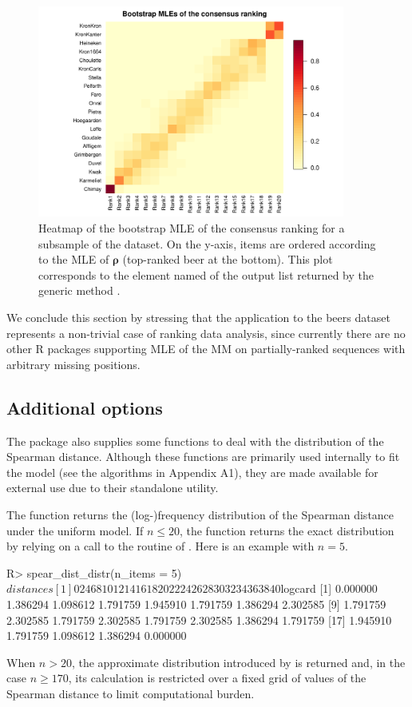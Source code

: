 \begin{figure}[t]
     \centering
     \includegraphics[scale=0.7,width=0.9\textwidth]{figures/RJ2025_paper_heat.pdf}
      \caption{Heatmap of the bootstrap MLE of the consensus ranking for a subsample of the  dataset. On the y-axis, items are ordered according to the MLE of $\bm\rho$ (top-ranked beer at the bottom). This plot corresponds to the element named  of the output list returned by the generic method .}
     \label{fig:heat_beers}
\end{figure}
%
We conclude this section by stressing that the application to the beers dataset represents a non-trivial case of ranking data analysis, since currently there are no other \textsf{R} packages supporting MLE of the MM on partially-ranked sequences with arbitrary missing positions.



\subsection{Additional options}

The  package also supplies some functions to deal with the distribution of the Spearman distance. Although these functions are primarily used internally to fit the model (see the algorithms in Appendix A1), they are made available for external use due to their standalone utility.


The function  returns the (log-)frequency distribution of the Spearman distance under the uniform model. If $n\leq 20$, the function returns the exact distribution by relying on a call to the  routine of . Here is an example with $n=5$.
\begin{example}
R> spear_dist_distr(n_items = 5)
$distances
 [1]  0  2  4  6  8 10 12 14 16 18 20 22 24 26 28 30 32 34 36 38 40
$logcard
 [1] 0.000000 1.386294 1.098612 1.791759 1.945910 1.791759 1.386294 2.302585
 [9] 1.791759 2.302585 1.791759 2.302585 1.791759 2.302585 1.386294 1.791759
[17] 1.945910 1.791759 1.098612 1.386294 0.000000
\end{example}
When $n> 20$, the approximate distribution introduced by \cite{crispino23efficient} is returned and, in the case $n\geq 170$, its calculation is restricted over a fixed grid of values of the Spearman distance to limit computational burden.

